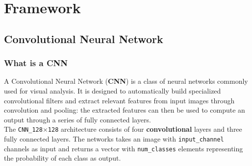 \documentclass{report}
\begin{document}
\chapter{Framework}
\section{Convolutional Neural Network}
\subsection{What is a CNN}
A Convolutional Neural Network (\textbf{CNN}) is a class of neural networks commonly used for visual analysis. It is designed to automatically build specialized convolutional filters and extract relevant features from input images through convolution and pooling: the extracted features can then be used to compute an output through a series of fully connected layers. \\
The \texttt{CNN\_128$\times$128} architecture consists of four \textbf{convolutional} layers and three fully connected layers. The networks takes an image with \texttt{input\_channel} channels as input and returns a vector with \texttt{num\_classes} elements representing the probability of each class as output.
\end{document}
